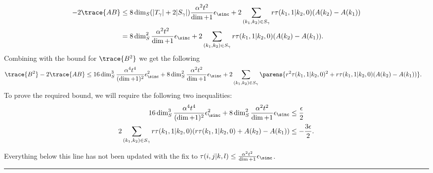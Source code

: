     \begin{align}
        -2 \trace{AB} &\leq 8 \dim_S(|T_{\gamma}| + 2 |S_{\gamma}|) \frac{\alpha^2 t^2}{\dim + 1} \epsilon_{\sinc} + 2 \sum_{(k_1, k_2) \in S_{\gamma}} r \tau(k_1, 1 | k_2, 0) ( A(k_2) - A(k_1)) \\
        &= 8 \dim_S^2 \frac{\alpha^2 t^2}{\dim + 1} \epsilon_{\sinc} + 2 \sum_{(k_1, k_2) \in S_{\gamma}} r \tau(k_1, 1 | k_2, 0) ( A(k_2) - A(k_1)).
    \end{align}
    Combining with the bound for $\trace{B^2}$ we get the following
    \begin{align}
        \trace{B^2} - 2 \trace{AB} &\leq 16 \dim_S^3 \frac{\alpha^4 t^4}{(\dim + 1)^2} \epsilon_{\sinc}^2 + 8 \dim_S^2 \frac{\alpha^2 t^2}{\dim + 1} \epsilon_{\sinc} + 2 \sum_{(k_1, k_2) \in S_{\gamma}} \parens{r^2 \tau(k_1, 1 |k_2, 0)^2 + r \tau(k_1, 1| k_2, 0) (A(k_2) - A(k_1))}.
    \end{align}
    To prove the required bound, we will require the following two inequalities:
    \begin{align}
        16 \dim_S^3 \frac{\alpha^4 t^4}{(\dim + 1)^2}\epsilon_{\sinc}^2 + 8 \dim_S^2 \frac{\alpha^2 t^2}{\dim + 1} \epsilon_{\sinc} &\leq \frac{\epsilon}{2} \\
        2 \sum_{(k_1, k_2) \in S_{\gamma}} r \tau(k_1, 1 | k_2, 0) (r \tau(k_1, 1 | k_2, 0)  + A(k_2) - A(k_1)) &\leq - \frac{3\epsilon}{2}.
    \end{align}
    
    Everything below this line has not been updated with the fix to $\tau(i,j|k,l) \leq \frac{\alpha^2 t^2}{\dim + 1} \epsilon_{\sinc}$. 
    
    \noindent\rule{\textwidth}{1pt}
    
